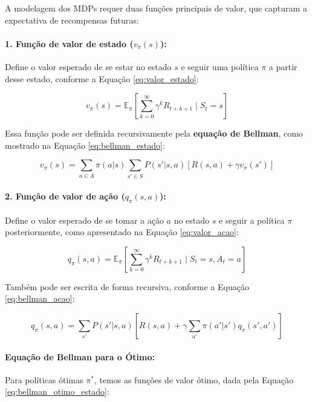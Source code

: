 A modelagem dos MDPs requer duas funções principais de valor, que capturam a expectativa de recompensas futuras:

\paragraph{1. Função de valor de estado (\(v_\pi(s)\)):}
Define o valor esperado de se estar no estado \(s\) e seguir uma política \(\pi\) a partir desse estado, conforme a Equação \ref{eq:valor_estado}:

\begin{equation}
\label{eq:valor_estado}
v_\pi(s) = \mathbb{E}_\pi \left[ \sum_{k=0}^{\infty} \gamma^k R_{t+k+1} \mid S_t = s \right]
\end{equation}

Essa função pode ser definida recursivamente pela \textbf{equação de Bellman}, como mostrado na Equação \ref{eq:bellman_estado}:

\begin{equation}
\label{eq:bellman_estado}
v_\pi(s) = \sum_{a \in A} \pi(a|s) \sum_{s' \in S} P(s'|s, a) \left[ R(s, a) + \gamma v_\pi(s') \right]
\end{equation}

\paragraph{2. Função de valor de ação (\(q_\pi(s, a)\)):}
Define o valor esperado de se tomar a ação \(a\) no estado \(s\) e seguir a política \(\pi\) posteriormente, como apresentado na Equação \ref{eq:valor_acao}:

\begin{equation}
\label{eq:valor_acao}
q_\pi(s, a) = \mathbb{E}_\pi \left[ \sum_{k=0}^{\infty} \gamma^k R_{t+k+1} \mid S_t = s, A_t = a \right]
\end{equation}

Também pode ser escrita de forma recursiva, conforme a Equação \ref{eq:bellman_acao}:

\begin{equation}
\label{eq:bellman_acao}
q_\pi(s, a) = \sum_{s'} P(s'|s, a) \left[ R(s, a) + \gamma \sum_{a'} \pi(a'|s') q_\pi(s', a') \right]
\end{equation}

\paragraph{Equação de Bellman para o Ótimo:}
Para políticas ótimas \(\pi^*\), temos as funções de valor ótimo, dada pela Equação \ref{eq:bellman_otimo_estado}:


